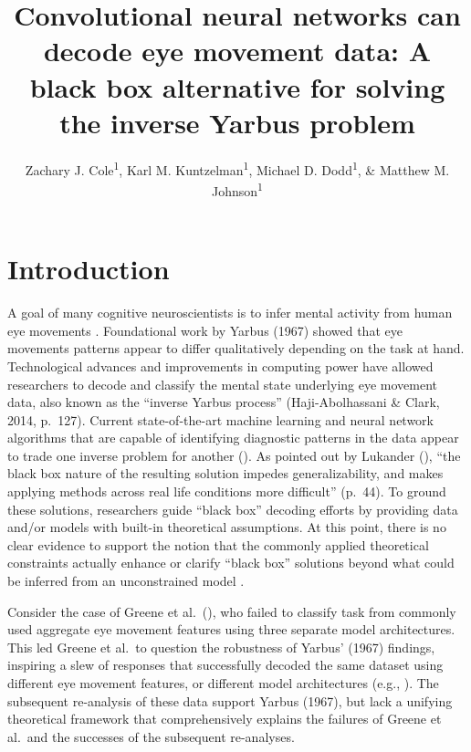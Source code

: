 \documentclass[
  english,
  man]{apa6}
\author{Zachary J. Cole\textsuperscript{1}, Karl M. Kuntzelman\textsuperscript{1}, Michael D. Dodd\textsuperscript{1}, \& Matthew M. Johnson\textsuperscript{1}}
\affiliation{
\vspace{0.5cm}
\textsuperscript{1} University of Nebraska-Lincoln}
\title{Convolutional neural networks can decode eye movement data: A black box alternative for solving the inverse Yarbus problem}
\date{}
\begin{document}
\maketitle

\section{Introduction}

A goal of many cognitive neuroscientists is to infer mental activity from human eye movements . Foundational work by Yarbus (1967) showed that eye movements patterns appear to differ qualitatively depending on the task at hand. Technological advances and improvements in computing power have allowed researchers to decode and classify the mental state underlying eye movement data, also known as the \enquote{inverse Yarbus process} (Haji-Abolhassani \& Clark, 2014, p.~127). Current state-of-the-art machine learning and neural network algorithms that are capable of identifying diagnostic patterns in the data appear to trade one inverse problem for another (). As pointed out by Lukander (), \enquote{the black box nature of the resulting solution impedes generalizability, and makes applying methods across real life conditions more difficult} (p.~44). To ground these solutions, researchers guide \enquote{black box} decoding efforts by providing data and/or models with built-in theoretical assumptions. At this point, there is no clear evidence to support the notion that the commonly applied theoretical constraints actually enhance or clarify \enquote{black box} solutions beyond what could be inferred from an unconstrained model .

Consider the case of Greene et al.~(), who failed to classify task from commonly used aggregate eye movement features using three separate model architectures. This led Greene et al.~to question the robustness of Yarbus' (1967) findings, inspiring a slew of responses that successfully decoded the same dataset using different eye movement features, or different model architectures (e.g., ). The subsequent re-analysis of these data support Yarbus (1967), but lack a unifying theoretical framework that comprehensively explains the failures of Greene et al.~and the successes of the subsequent re-analyses.
\end{document}
